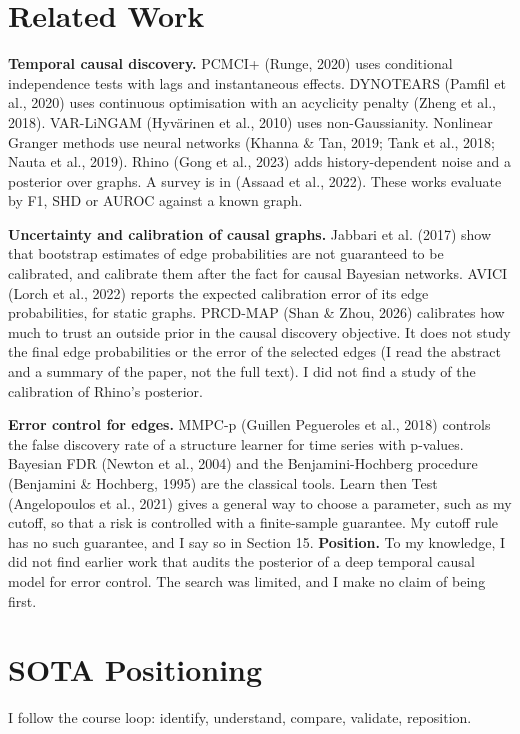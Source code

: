 \documentclass[10pt]{article}
\begin{document}
\section{Related Work}
\textbf{Temporal causal discovery.} PCMCI+ (Runge, 2020) uses conditional independence tests with lags and instantaneous effects. DYNOTEARS (Pamfil et al., 2020) uses continuous optimisation with an acyclicity penalty (Zheng et al., 2018). VAR-LiNGAM (Hyvärinen et al., 2010) uses non-Gaussianity. Nonlinear Granger methods use neural networks (Khanna \& Tan, 2019; Tank et al., 2018; Nauta et al., 2019). Rhino (Gong et al., 2023) adds history-dependent noise and a posterior over graphs. A survey is in (Assaad et al., 2022). These works evaluate by F1, SHD or AUROC against a known graph.

\textbf{Uncertainty and calibration of causal graphs.} Jabbari et al. (2017) show that bootstrap estimates of edge probabilities are not guaranteed to be calibrated, and calibrate them after the fact for causal Bayesian networks. AVICI (Lorch et al., 2022) reports the expected calibration error of its edge probabilities, for static graphs. PRCD-MAP (Shan \& Zhou, 2026) calibrates how much to trust an outside prior in the causal discovery objective. It does not study the final edge probabilities or the error of the selected edges (I read the abstract and a summary of the paper, not the full text). I did not find a study of the calibration of Rhino's posterior.

\textbf{Error control for edges.} MMPC-p (Guillen Pegueroles et al., 2018) controls the false discovery rate of a structure learner for time series with p-values. Bayesian FDR (Newton et al., 2004) and the Benjamini-Hochberg procedure (Benjamini \& Hochberg, 1995) are the classical tools. Learn then Test (Angelopoulos et al., 2021) gives a general way to choose a parameter, such as my cutoff, so that a risk is controlled with a finite-sample guarantee. My cutoff rule has no such guarantee, and I say so in Section 15. \textbf{Position.} To my knowledge, I did not find earlier work that audits the posterior of a deep temporal causal model for error control. The search was limited, and I make no claim of being first.

\section{SOTA Positioning}
I follow the course loop: identify, understand, compare, validate, reposition.
\end{document}

